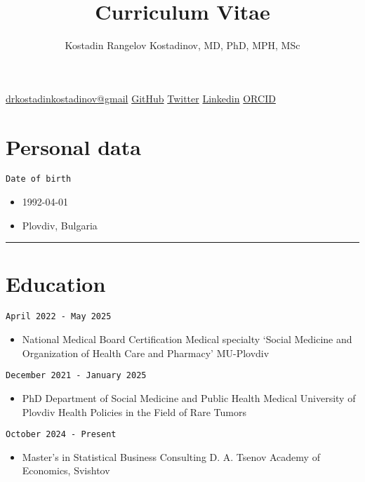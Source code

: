 \documentclass[
  12pt,
  letterpaper,
  DIV=11,
  numbers=noendperiod]{scrartcl}
\title{Curriculum Vitae}
\author{Kostadin Rangelov Kostadinov, MD, PhD, MPH, MSc}
\date{}
\providecommand{\tightlist}{%
  \setlength{\itemsep}{0pt}\setlength{\parskip}{0pt}}\usepackage{longtable,booktabs,array}
\begin{document}
\maketitle


\href{https://drkostadinkostadinov@gmail.com}{drkostadinkostadinov@gmail}
\textbar{} \href{https://github.com/kostadinoff}{GitHub} \textbar{}
\href{https://twitter.com/kostadinoffMD}{Twitter} \textbar{}
\href{https://linkedin.com/in/kostadinovmd}{Linkedin} \textbar{}
\href{https://orcid.org/0000-0003-1414-8738}{ORCID}

\section{Personal data}\label{personal-data}

\texttt{Date\ of\ birth}

\begin{itemize}
\tightlist
\item
  1992-04-01
\item
  Plovdiv, Bulgaria
\end{itemize}

\begin{center}\rule{0.5\linewidth}{0.5pt}\end{center}

\section{Education}\label{education}

\texttt{April\ 2022\ -\ May\ 2025}

\begin{itemize}
\tightlist
\item
  National Medical Board Certification \textbar{} Medical specialty
  `Social Medicine and Organization of Health Care and Pharmacy'
  \textbar{} MU-Plovdiv
\end{itemize}

\texttt{December\ 2021\ -\ January\ 2025}

\begin{itemize}
\tightlist
\item
  PhD \textbar{} Department of Social Medicine and Public Health
  \textbar{} Medical University of Plovdiv \textbar{} Health Policies in
  the Field of Rare Tumors
\end{itemize}

\texttt{October\ 2024\ -\ Present}

\begin{itemize}
\tightlist
\item
  Master's in Statistical Business Consulting \textbar{} D. A. Tsenov
  Academy of Economics, Svishtov
\end{itemize}
\end{document}
